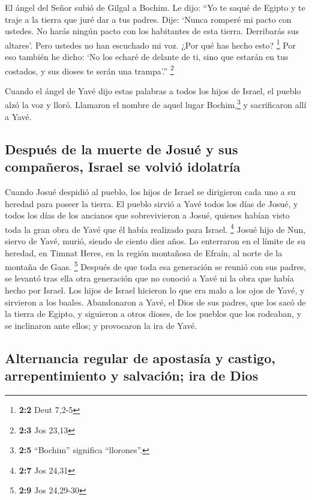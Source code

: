  El ángel del Señor subió de Gilgal a Bochim. Le dijo:
``Yo te saqué de Egipto y te traje a la tierra que juré dar a tus
padres. Dije: `Nunca romperé mi pacto con ustedes.  No
harás ningún pacto con los habitantes de esta tierra. Derribarás sus
altares'. Pero ustedes no han escuchado mi voz. ¿Por qué has hecho esto?
\footnote{\textbf{2:2} Deut 7,2-5}  Por eso también he
dicho: `No los echaré de delante de ti, sino que estarán en tus
costados, y sus dioses te serán una trampa'.'' \footnote{\textbf{2:3}
  Jos 23,13}

 Cuando el ángel de Yavé dijo estas palabras a todos los
hijos de Israel, el pueblo alzó la voz y lloró.  Llamaron
el nombre de aquel lugar Bochim,\footnote{\textbf{2:5} ``Bochim''
  significa ``llorones''.} y sacrificaron allí a Yavé.

\hypertarget{despuuxe9s-de-la-muerte-de-josuuxe9-y-sus-compauxf1eros-israel-se-volviuxf3-idolatruxeda}{%
\subsection{Después de la muerte de Josué y sus compañeros, Israel se
volvió
idolatría}\label{despuuxe9s-de-la-muerte-de-josuuxe9-y-sus-compauxf1eros-israel-se-volviuxf3-idolatruxeda}}

 Cuando Josué despidió al pueblo, los hijos de Israel se
dirigieron cada uno a su heredad para poseer la tierra. 
El pueblo sirvió a Yavé todos los días de Josué, y todos los días de los
ancianos que sobrevivieron a Josué, quienes habían visto toda la gran
obra de Yavé que él había realizado para Israel. \footnote{\textbf{2:7}
  Jos 24,31}  Josué hijo de Nun, siervo de Yavé, murió,
siendo de ciento diez años.  Lo enterraron en el límite de
su heredad, en Timnat Heres, en la región montañosa de Efraín, al norte
de la montaña de Gaas. \footnote{\textbf{2:9} Jos 24,29-30}
 Después de que toda esa generación se reunió con sus
padres, se levantó tras ella otra generación que no conoció a Yavé ni la
obra que había hecho por Israel.  Los hijos de Israel
hicieron lo que era malo a los ojos de Yavé, y sirvieron a los baales.
 Abandonaron a Yavé, el Dios de sus padres, que los sacó
de la tierra de Egipto, y siguieron a otros dioses, de los pueblos que
los rodeaban, y se inclinaron ante ellos; y provocaron la ira de Yavé.

\hypertarget{alternancia-regular-de-apostasuxeda-y-castigo-arrepentimiento-y-salvaciuxf3n-ira-de-dios}{%
\subsection{Alternancia regular de apostasía y castigo, arrepentimiento
y salvación; ira de
Dios}\label{alternancia-regular-de-apostasuxeda-y-castigo-arrepentimiento-y-salvaciuxf3n-ira-de-dios}}

